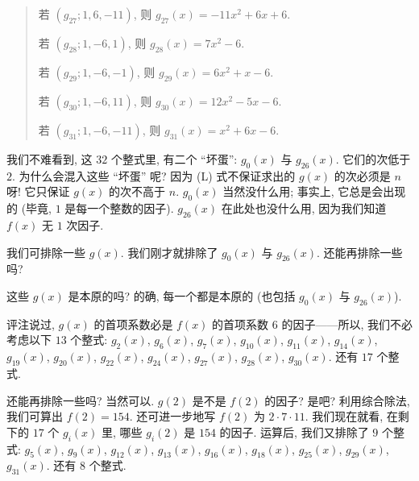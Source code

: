 \begin{example}
\begin{quotation}
        若 $(g_{27}; 1, 6, -11)$, 则 $g_{27} (x) = -11 x^2+6 x+6$.

        若 $(g_{28}; 1, -6, 1)$, 则 $g_{28} (x) = 7 x^2-6$.

        若 $(g_{29}; 1, -6, -1)$, 则 $g_{29} (x) = 6 x^2+x-6$.

        若 $(g_{30}; 1, -6, 11)$, 则 $g_{30} (x) = 12 x^2-5 x-6$.

        若 $(g_{31}; 1, -6, -11)$, 则 $g_{31} (x) = x^2+6 x-6$.
    \end{quotation}

    我们不难看到, 这 $32$ 个整式里, 有二个 ``坏蛋'': $g_0 (x)$ 与 $g_{26} (x)$. 它们的次低于 $2$. 为什么会混入这些 ``坏蛋'' 呢? 因为 (L) 式不保证求出的 $g(x)$ 的次必须是 $n$ 呀! 它只保证 $g(x)$ 的次不高于 $n$. $g_0 (x)$ 当然没什么用; 事实上, 它总是会出现的 (毕竟, $1$ 是每一个整数的因子). $g_{26} (x)$ 在此处也没什么用, 因为我们知道 $f(x)$ 无 $1$ 次因子.

    我们可排除一些 $g(x)$. 我们刚才就排除了 $g_0 (x)$ 与 $g_{26} (x)$. 还能再排除一些吗?

    这些 $g(x)$ 是本原的吗? 的确, 每一个都是本原的 (也包括 $g_0 (x)$ 与 $g_{26} (x)$).

    评注说过, $g(x)$ 的首项系数必是 $f(x)$ 的首项系数 $6$ 的因子——所以, 我们不必考虑以下 $13$ 个整式: $g_2 (x)$, $g_6 (x)$, $g_7 (x)$, $g_{10} (x)$, $g_{11} (x)$, $g_{14} (x)$, $g_{19} (x)$, $g_{20} (x)$, $g_{22} (x)$, $g_{24} (x)$, $g_{27} (x)$, $g_{28} (x)$, $g_{30} (x)$. 还有 $17$ 个整式.

    还能再排除一些吗? 当然可以. $g(2)$ 是不是 $f(2)$ 的因子? 是吧? 利用综合除法, 我们可算出 $f(2) = 154$. 还可进一步地写 $f(2)$ 为 $2 \cdot 7 \cdot 11$. 我们现在就看, 在剩下的 $17$ 个 $g_i (x)$ 里, 哪些 $g_i (2)$ 是 $154$ 的因子. 运算后, 我们又排除了 $9$ 个整式: $g_5 (x)$, $g_9 (x)$, $g_{12} (x)$, $g_{13} (x)$, $g_{16} (x)$, $g_{18} (x)$, $g_{25} (x)$, $g_{29} (x)$, $g_{31} (x)$. 还有 $8$ 个整式.


\end{example}
